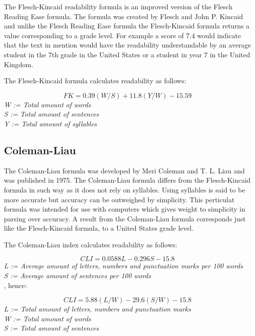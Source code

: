 \documentclass[a4paper]{article}
\begin{document}
The Flesch-Kincaid readability formula is an improved version of the Flesch Reading Ease formula. The formula was created by Flesch and John P. Kincaid and unlike the Flesch Reading Ease formula the Flesch-Kincaid formula returns a value corresponding to a grade level\cite{navy75}. For example a score of 7.4 would indicate that the text in mention would have the readability understandable by an average student in the 7th grade in the United States or a student in year 7 in the United Kingdom. 

The Flesch-Kincaid formula calculates readability as follows:

\begin{equation}
FK = 0.39(W/S) + 11.8(Y/W) - 15.59
\end{equation}
\emph{W := Total amount of words}\\
\emph{S := Total amount of sentences}\\
\emph{Y := Total amount of syllables}\\

\subsection{Coleman-Liau}

The Coleman-Liau formula was developed by Meri Coleman and T. L. Liau and was published in 1975. The Coleman-Liau formula differs from the Flesch-Kincaid formula in such way as it does not rely on syllables\cite{coleman75}. Using syllables is said to be more accurate but accuracy can be outweighed by simplicity. This perticulat formula was intended for use with computers which gives weight to simplicity in parsing over accuracy\cite{coleman75}. A result from the Coleman-Liau formula corresponds just like the Flesch-Kincaid formula, to a United States grade level\cite{coleman75}. 

The Coleman-Liau index calculates readability as follows:

\begin{equation}
CLI = 0.0588L - 0.296S - 15.8
\end{equation}
\emph{L := Average amount of letters, numbers and punctuation marks per 100 words}\\
\emph{S := Average amount of sentences per 100 words}\\
\newline
, hence:

\begin{equation}
CLI = 5.88(L/W) - 29.6(S/W) - 15.8
\end{equation}
\emph{L := Total amount of letters, numbers and punctuation marks}\\
\emph{W := Total amount of words}\\
\emph{S := Total amount of sentences}\\
\end{document}
